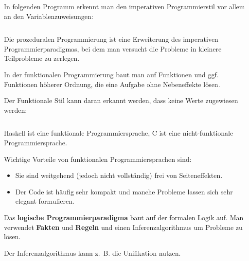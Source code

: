 \begin{beispiel}
    In folgenden Programm erkennt man den imperativen Programmierstil vor allem
    an den Variablenzuweisungen:
    \inputminted[numbersep=5pt, tabsize=4]{c}{scripts/c/fibonacci-imperativ.c}
\end{beispiel}

\begin{definition}%
    Die prozeduralen Programmierung ist eine Erweiterung des imperativen
    Programmierparadigmas, bei dem man versucht die Probleme in
    kleinere Teilprobleme zu zerlegen.
\end{definition}

\begin{definition}%
    In der funktionalen Programmierung baut man auf Funktionen und
    ggf. Funktionen höherer Ordnung, die eine Aufgabe ohne Nebeneffekte
    lösen.
\end{definition}

\begin{beispiel}
    Der Funktionale Stil kann daran erkannt werden, dass keine Werte zugewiesen werden:
    \inputminted[numbersep=5pt, tabsize=4]{haskell}{scripts/haskell/fibonacci-akk.hs}
\end{beispiel}

Haskell ist eine funktionale Programmiersprache, C ist eine
nicht-funktionale Programmiersprache.

Wichtige Vorteile von funktionalen Programmiersprachen sind:
\begin{itemize}
    \item Sie sind weitgehend (jedoch nicht vollständig) frei von Seiteneffekten.
    \item Der Code ist häufig sehr kompakt und manche Probleme lassen
          sich sehr elegant formulieren.
\end{itemize}

\begin{definition}%
    Das \textbf{logische Programmierparadigma} baut auf der formalen Logik auf.
    Man verwendet \textbf{Fakten} und \textbf{Regeln}
    und einen Inferenzalgorithmus um Probleme zu lösen.
\end{definition}

Der Inferenzalgorithmus kann z.~B. die Unifikation nutzen.

